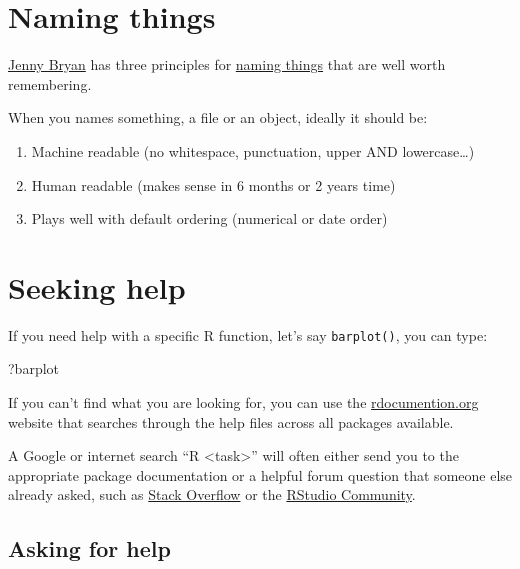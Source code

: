 \documentclass[12pt,]{book}
\newenvironment{Shaded}{\begin{snugshade}}{\end{snugshade}}
\newcommand{\NormalTok}[1]{#1}
\providecommand{\tightlist}{%
  \setlength{\itemsep}{0pt}\setlength{\parskip}{0pt}}
\theoremstyle{definition}
\theoremstyle{definition}
\theoremstyle{definition}
\theoremstyle{remark}
\begin{document}
\hypertarget{names}{\section{Naming things}\label{names}}

\href{https://ropensci.org/blog/2017/12/08/rprofile-jenny-bryan/}{Jenny
Bryan} has three principles for
\href{http://www2.stat.duke.edu/~rcs46/lectures_2015/01-markdown-git/slides/naming-slides/naming-slides.pdf}{naming
things} that are well worth remembering.

When you names something, a file or an object, ideally it should be:

\begin{enumerate}
\def\labelenumi{\arabic{enumi}.}
\tightlist
\item
  Machine readable (no whitespace, punctuation, upper AND
  lowercase\ldots{})
\item
  Human readable (makes sense in 6 months or 2 years time)
\item
  Plays well with default ordering (numerical or date order)
\end{enumerate}

\section{Seeking help}\label{seeking-help}

If you need help with a specific R function, let's say
\texttt{barplot()}, you can type:

\begin{Shaded}
\begin{Highlighting}[]
\NormalTok{?barplot}
\end{Highlighting}
\end{Shaded}

If you can't find what you are looking for, you can use the
\href{http://www.rdocumentation.org}{rdocumention.org} website that
searches through the help files across all packages available.

A Google or internet search ``R \textless{}task\textgreater{}'' will
often either send you to the appropriate package documentation or a
helpful forum question that someone else already asked, such as
\href{http://stackoverflow.com/questions/tagged/r}{Stack Overflow} or
the \href{https://community.rstudio.com/}{RStudio Community}.

\subsection{Asking for help}\label{asking-for-help}
\end{document}
